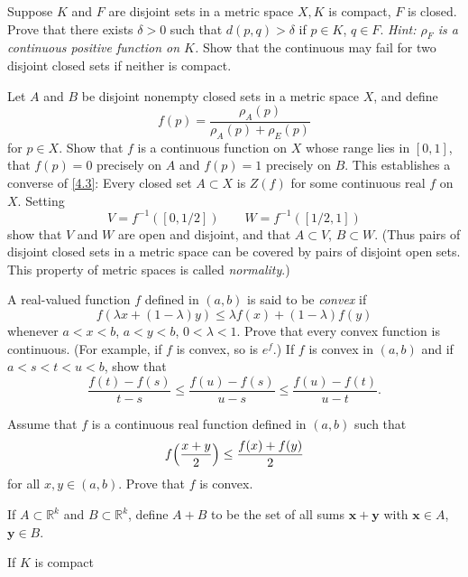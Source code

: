 \begin{exercise}
\item
  Suppose \(K\) and \(F\) are disjoint sets in a metric space \(X,K\) is
  compact, \(F\) is closed.
  Prove that there exists \(\delta > 0\) such that \(d(p,q) > \delta\) if
  \(p\in K\), \(q\in F\).
  \textit{Hint: \(\rho_F\) is a continuous positive function on \(K\).}
  Show that the continuous may fail for two disjoint closed sets if neither is
  compact.
\item
  Let \(A\) and \(B\) be disjoint nonempty closed sets in a metric space \(X\),
  and define
  \[
  f(p) = \frac{\rho_A(p)}{\rho_A(p) + \rho_E(p)}
  \]
  for \(p\in X\).
  Show that \(f\) is a continuous function on \(X\) whose range lies in
  \([0,1]\), that \(f(p) = 0\)  precisely on \(A\) and \(f(p) = 1\) precisely
  on \(B\).
  This establishes a converse of \cref{4.3}: Every closed set \(A\subset X\) is
  \(Z(f)\) for some continuous real \(f\) on \(X\).
  Setting
  \[
  V = f^{-1}([0, 1/2])\qquad W = f^{-1}([1/2, 1])
  \]
  show that \(V\) and \(W\) are open and disjoint, and that \(A\subset V\),
  \(B\subset W\).
  (Thus pairs of disjoint closed sets in a metric space can be covered by pairs
  of disjoint open sets.
  This property of metric spaces is called \textit{normality}.)
\item
  A real-valued function \(f\) defined in \((a,b)\) is said to be
  \textit{convex} if
  \[
  f(\lambda x + (1 - \lambda)y)\leq\lambda f(x) + (1 - \lambda)f(y)
  \]
  whenever \(a < x < b\), \(a < y < b\), \(0 < \lambda < 1\).
  Prove that every convex function is continuous.
  (For example, if \(f\) is convex, so is \(e^f\).)
  If \(f\) is convex in \((a,b)\) and if \(a < s < t < u < b\), show that
  \[
  \frac{f(t) - f(s)}{t - s}\leq\frac{f(u) - f(s)}{u - s}\leq
  \frac{f(u) - f(t)}{u - t}.
  \]
\item
  Assume that \(f\) is a continuous real function defined in \((a,b)\) such
  that
  \[
  f\Bigl(\frac{x + y}{2}\Bigr)\leq \frac{f(x) + f(y)}{2}
  \]
  for all \(x,y\in (a,b)\).
  Prove that \(f\) is convex.
\item
  If \(A\subset\mathbb{R}^k\) and \(B\subset\mathbb{R}^k\), define \(A + B\) to
  be the set of all sums \(\mathbold{x + y}\) with \(\mathbold{x}\in A\),
  \(\mathbold{y}\in B\).
  \begin{exercise}[label = (\alph*)]
  \item
    If \(K\) is compact
  \end{exercise}
\end{exercise}

